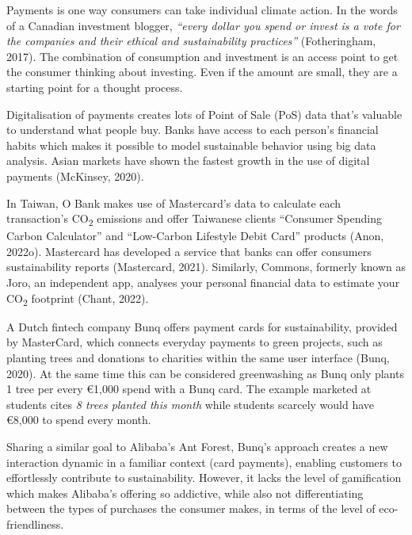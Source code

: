 \documentclass[
  letterpaper,
  DIV=11,
  numbers=noendperiod]{scrartcl}
\begin{document}
Payments is one way consumers can take individual climate action. In the
words of a Canadian investment blogger, \emph{``every dollar you spend
or invest is a vote for the companies and their ethical and
sustainability practices''} (Fotheringham, 2017). The combination of
consumption and investment is an access point to get the consumer
thinking about investing. Even if the amount are small, they are a
starting point for a thought process.

Digitalisation of payments creates lots of Point of Sale (PoS) data
that's valuable to understand what people buy. Banks have access to each
person's financial habits which makes it possible to model sustainable
behavior using big data analysis. Asian markets have shown the fastest
growth in the use of digital payments (McKinsey, 2020).

In Taiwan, O Bank makes use of Mastercard's data to calculate each
transaction's CO\textsubscript{2} emissions and offer Taiwanese clients
``Consumer Spending Carbon Calculator'' and ``Low-Carbon Lifestyle Debit
Card'' products (Anon, 2022o). Mastercard has developed a service that
banks can offer consumers sustainability reports (Mastercard, 2021).
Similarly, Commons, formerly known as Joro, an independent app, analyses
your personal financial data to estimate your CO\textsubscript{2}
footprint (Chant, 2022).

A Dutch fintech company Bunq offers payment cards for sustainability,
provided by MasterCard, which connects everyday payments to green
projects, such as planting trees and donations to charities within the
same user interface (Bunq, 2020). At the same time this can be
considered greenwashing as Bunq only plants 1 tree per every €1,000
spend with a Bunq card. The example marketed at students cites \emph{8
trees planted this month} while students scarcely would have €8,000 to
spend every month.

Sharing a similar goal to Alibaba's Ant Forest, Bunq's approach creates
a new interaction dynamic in a familiar context (card payments),
enabling customers to effortlessly contribute to sustainability.
However, it lacks the level of gamification which makes Alibaba's
offering so addictive, while also not differentiating between the types
of purchases the consumer makes, in terms of the level of
eco-friendliness.
\end{document}
